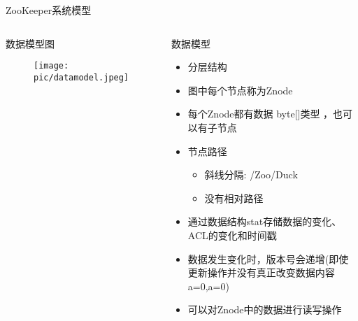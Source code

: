 \documentclass[10pt]{beamer}
\begin{document}
\begin{frame}[fragile]{ZooKeeper系统模型}
  \begin{columns}

  \begin{block}{数据模型图}
    \begin{figure}
      \begin{center}
        \raggedleft \texttt{[image: pic/datamodel.jpeg]}
      \end{center}
    \end{figure}
  \end{block}


  \begin{block}{数据模型}
      \begin{itemize}
        \item 分层结构
        \item 图中每个节点称为Znode
        \item 每个Znode都有数据 byte[]类型 ，也可以有子节点
        \item 节点路径
          \begin{itemize}
            \item 斜线分隔: /Zoo/Duck
            \item 没有相对路径
          \end{itemize}
        \item 通过数据结构stat存储数据的变化、ACL的变化和时间戳
        \item 数据发生变化时，版本号会递增(即使更新操作并没有真正改变数据内容 a=0,a=0)
        \item 可以对Znode中的数据进行读写操作
      \end{itemize}
  \end{block}
  \end{columns}
\end{frame}
\end{document}
